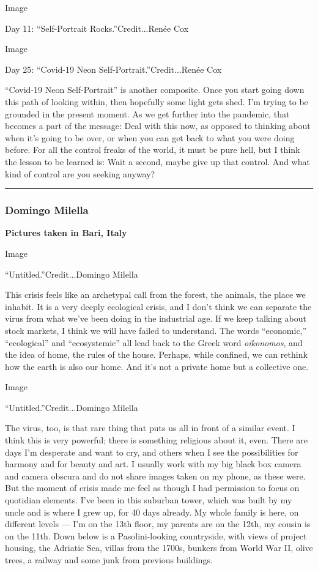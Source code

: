 Image

Day 11: ``Self-Portrait Rocks.''Credit...Renée Cox

Image

Day 25: ``Covid-19 Neon Self-Portrait.''Credit...Renée Cox

``Covid-19 Neon Self-Portrait'' is another composite. Once you start
going down this path of looking within, then hopefully some light gets
shed. I'm trying to be grounded in the present moment. As we get further
into the pandemic, that becomes a part of the message: Deal with this
now, as opposed to thinking about when it's going to be over, or when
you can get back to what you were doing before. For all the control
freaks of the world, it must be pure hell, but I think the lesson to be
learned is: Wait a second, maybe give up that control. And what kind of
control are you seeking anyway?

\begin{center}\rule{0.5\linewidth}{\linethickness}\end{center}

\hypertarget{domingo-milella}{%
\subsubsection{\texorpdfstring{\textbf{Domingo
Milella}}{Domingo Milella}}\label{domingo-milella}}

\textbf{Pictures taken in Bari, Italy}

Image

``Untitled.''Credit...Domingo Milella

This crisis feels like an archetypal call from the forest, the animals,
the place we inhabit. It is a very deeply ecological crisis, and I don't
think we can separate the virus from what we've been doing in the
industrial age. If we keep talking about stock markets, I think we will
have failed to understand. The words ``economic,'' ``ecological'' and
``ecosystemic'' all lead back to the Greek word \emph{oikonomos}, and
the idea of home, the rules of the house. Perhaps, while confined, we
can rethink how the earth is also our home. And it's not a private home
but a collective one.

Image

``Untitled.''Credit...Domingo Milella

The virus, too, is that rare thing that puts us all in front of a
similar event. I think this is very powerful; there is something
religious about it, even. There are days I'm desperate and want to cry,
and others when I see the possibilities for harmony and for beauty and
art. I usually work with my big black box camera and camera obscura and
do not share images taken on my phone, as these were. But the moment of
crisis made me feel as though I had permission to focus on quotidian
elements. I've been in this suburban tower, which was built by my uncle
and is where I grew up, for 40 days already. My whole family is here, on
different levels --- I'm on the 13th floor, my parents are on the 12th,
my cousin is on the 11th. Down below is a Pasolini-looking countryside,
with views of project housing, the Adriatic Sea, villas from the 1700s,
bunkers from World War II, olive trees, a railway and some junk from
previous buildings.


